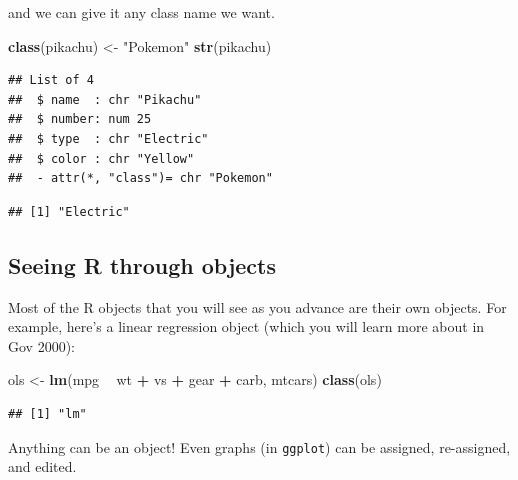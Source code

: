 \documentclass[]{book}
\newenvironment{Shaded}{\begin{snugshade}}{\end{snugshade}}
\newcommand{\KeywordTok}[1]{\textcolor[rgb]{0.13,0.29,0.53}{\textbf{#1}}}
\newcommand{\StringTok}[1]{\textcolor[rgb]{0.31,0.60,0.02}{#1}}
\newcommand{\OperatorTok}[1]{\textcolor[rgb]{0.81,0.36,0.00}{\textbf{#1}}}
\newcommand{\NormalTok}[1]{#1}
\theoremstyle{definition}
\theoremstyle{definition}
\theoremstyle{definition}
\theoremstyle{remark}
\begin{document}
and we can give it any class name we want.

\begin{Shaded}
\begin{Highlighting}[]
\KeywordTok{class}\NormalTok{(pikachu) <-}\StringTok{ "Pokemon"}
\KeywordTok{str}\NormalTok{(pikachu)}
\end{Highlighting}
\end{Shaded}

\begin{verbatim}
## List of 4
##  $ name  : chr "Pikachu"
##  $ number: num 25
##  $ type  : chr "Electric"
##  $ color : chr "Yellow"
##  - attr(*, "class")= chr "Pokemon"
\end{verbatim}

\begin{Shaded}
\end{Shaded}

\begin{verbatim}
## [1] "Electric"
\end{verbatim}

\subsection{Seeing R through objects}\label{seeing-r-through-objects}

Most of the R objects that you will see as you advance are their own
objects. For example, here's a linear regression object (which you will
learn more about in Gov 2000):

\begin{Shaded}
\begin{Highlighting}[]
\NormalTok{ols <-}\StringTok{ }\KeywordTok{lm}\NormalTok{(mpg }\OperatorTok{~}\StringTok{ }\NormalTok{wt }\OperatorTok{+}\StringTok{ }\NormalTok{vs }\OperatorTok{+}\StringTok{ }\NormalTok{gear }\OperatorTok{+}\StringTok{ }\NormalTok{carb, mtcars)}
\KeywordTok{class}\NormalTok{(ols)}
\end{Highlighting}
\end{Shaded}

\begin{verbatim}
## [1] "lm"
\end{verbatim}

Anything can be an object! Even graphs (in \texttt{ggplot}) can be
assigned, re-assigned, and edited.
\end{document}
